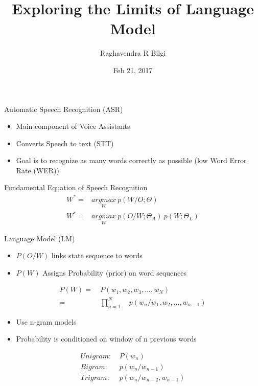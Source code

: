 \documentclass{beamer}
\title[Neural LM]{Exploring the Limits of Language Model}
\author{Raghavendra R Bilgi}
\date{Feb 21, 2017}
\begin{document}
\begin{frame}
\titlepage
\end{frame}


\begin{frame}{Automatic Speech Recognition (ASR)}
	\begin{itemize}
		\item Main component of Voice Assistants
		\item Converts Speech to text (STT)
		\item Goal is to recognize as many words correctly as possible (low Word Error Rate (WER))
	\end{itemize}

	\begin{block}{Fundamental Equation of Speech Recognition}
			\begin{align*}
				W^{*} =& \underset{W}{argmax}\ p(W/O; \Theta) \\
				W^{*} =& \underset{W}{argmax}\ p(O/W; {\Theta}_A)\ p(W; {\Theta}_{L})
			\end{align*}
	\end{block}
\end{frame}


\begin{frame}{Language Model (LM)}
	\begin{itemize}
		\item $P(O/W)$ links state sequence to words
		\item $P(W)$ Assigns Probability (prior) on word sequences
	\end{itemize}

	\begin{align*}
		P(W) =&\ P(w_1,w_2,w_3,...,w_N) \\
		     =&\ \prod_{n=1}^{N}\quad p(w_n/w_1,w_2,...,w_{n-1})
	\end{align*}

	\begin{itemize}
		\item Use n-gram models
		\item Probability is conditioned on window of n previous words
	\end{itemize}

	\begin{align*}
		Unigram  :&\ P(w_n)   \\
		Bigram   :&\ p(w_n/w_{n-1})  \\
		Trigram  :&\ p(w_n/w_{n-2}, w_{n-1})
	\end{align*}
\end{frame}
\end{document}
